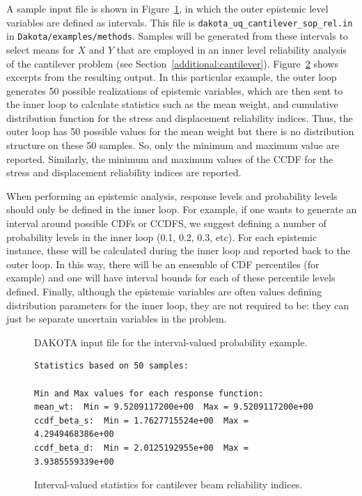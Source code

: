 A sample input file is shown in
Figure~\ref{adv_models:2ndprob}, in which the outer epistemic level
variables are defined as intervals.  This file is
\texttt{dakota\_uq\_cantilever\_sop\_rel.in} in
\texttt{Dakota/examples/methods}.  Samples will be generated from
these intervals to select means for $X$ and $Y$ that are employed in
an inner level reliability analysis of the cantilever problem (see
Section~\ref{additional:cantilever}).
Figure~\ref{adv_models:2ndprob_res} shows excerpts from the resulting
output.  In this particular example, the outer loop generates 50
possible realizations of epistemic variables, which are then sent to
the inner loop to calculate statistics such as the mean weight, and
cumulative distribution function for the stress and displacement
reliability indices.  Thus, the outer loop has 50 possible values for
the mean weight but there is no distribution structure on these 50
samples.  So, only the minimum and maximum value are reported.
Similarly, the minimum and maximum values of the CCDF for the stress
and displacement reliability indices are reported.

When performing an epistemic analysis, response levels and 
probability levels should only be defined in the inner loop. 
For example, if one wants to generate an interval around possible 
CDFs or CCDFS, we suggest defining a number of probability levels 
in the inner loop (0.1, 0.2, 0.3, etc).  For each epistemic instance, 
these will be calculated during the inner loop and reported back to the 
outer loop.  In this way, there will be an ensemble of CDF percentiles 
(for example) and one will have interval bounds for each of these 
percentile levels defined.  Finally, although the epistemic variables are 
often values defining distribution parameters for the inner loop, 
they are not required to be: they can just be separate uncertain variables 
in the problem. 
\begin{figure}
  \centering
  \begin{bigbox}
    \begin{tiny}
    \end{tiny}
  \end{bigbox}
  \caption{DAKOTA input file for the interval-valued probability example.}
  \label{adv_models:2ndprob}
\end{figure}

\begin{figure}
\centering
\begin{bigbox}
\begin{small}
\begin{verbatim}
Statistics based on 50 samples:

Min and Max values for each response function:
mean_wt:  Min = 9.5209117200e+00  Max = 9.5209117200e+00
ccdf_beta_s:  Min = 1.7627715524e+00  Max = 4.2949468386e+00
ccdf_beta_d:  Min = 2.0125192955e+00  Max = 3.9385559339e+00
\end{verbatim}
\end{small}
\end{bigbox}
\caption{Interval-valued statistics for cantilever beam reliability indices.}
\label{adv_models:2ndprob_res}
\end{figure}

